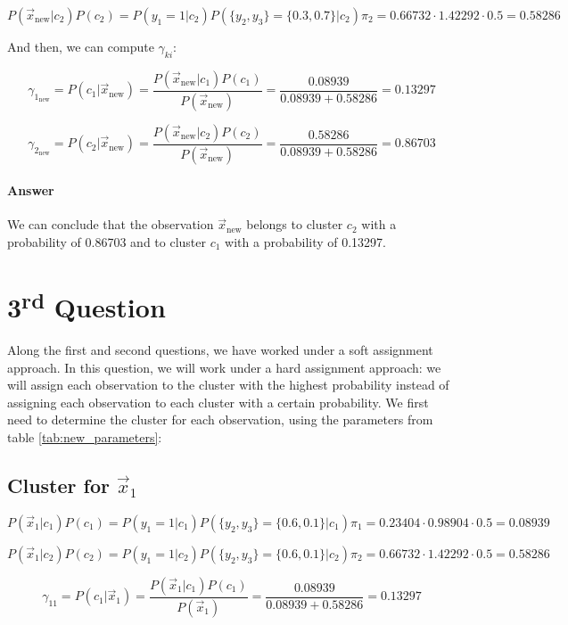 \documentclass{article}
\begin{document}
\[ P(\vec{x}_{\text{new}} | c_2) P(c_2) = P(y_1 = 1 | c_2) P(\{y_2, y_3\}  = \{0.3, 0.7\} | c_2) \pi_2 = 0.66732 \cdot 1.42292 \cdot 0.5 = 0.58286 \]

And then, we can compute $\gamma_{ki}$:

\[ \gamma_{1_{\text{new}}} = P(c_1| \vec{x}_{\text{new}}) = \frac{P(\vec{x}_{\text{new}} | c_1) P(c_1)}{P(\vec{x}_{\text{new}})} = \frac{0.08939}{0.08939 + 0.58286} = 0.13297 \]

\[ \gamma_{2_{\text{new}}} = P(c_2| \vec{x}_{\text{new}}) = \frac{P(\vec{x}_{\text{new}} | c_2) P(c_2)}{P(\vec{x}_{\text{new}})} = \frac{0.58286}{0.08939 + 0.58286} = 0.86703 \]

\paragraph{Answer} We can conclude that the observation $\vec{x}_{\text{new}}$ belongs to cluster $c_2$ with a probability of 0.86703 and to cluster $c_1$ with a probability of 0.13297.

\newpage

\section*{3\textsuperscript{rd} Question}

Along the first and second questions, we have worked under a soft assignment approach. In this question, we will work under a hard assignment approach: we will assign each observation to the cluster with the highest probability instead of assigning each observation to each cluster with a certain probability.
We first need to determine the cluster for each observation, using the parameters from table \ref{tab:new_parameters}:

\subsection*{Cluster for $\vec{x}_1$}

\[ P(\vec{x}_1 | c_1) P(c_1) = P(y_1 = 1 | c_1) P(\{y_2, y_3\}  = \{0.6, 0.1\} | c_1) \pi_1 = 0.23404 \cdot 0.98904 \cdot 0.5 = 0.08939 \]

\[ P(\vec{x}_1 | c_2) P(c_2) = P(y_1 = 1 | c_2) P(\{y_2, y_3\}  = \{0.6, 0.1\} | c_2) \pi_2 = 0.66732 \cdot 1.42292 \cdot 0.5 = 0.58286 \]

\[ \gamma_{11} = P(c_1| \vec{x}_1) = \frac{P(\vec{x}_1 | c_1) P(c_1)}{P(\vec{x}_1)} = \frac{0.08939}{0.08939 + 0.58286} = 0.13297 \]
\end{document}
